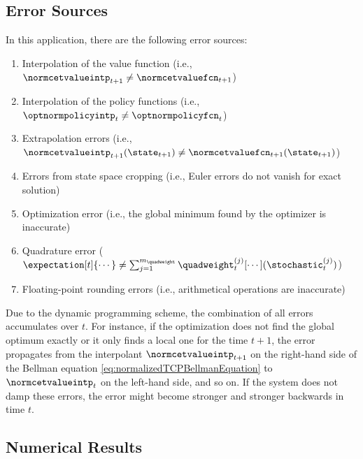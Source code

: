 \subsection{Error Sources}
\label{sec:842errorSources}


In this application, there are the following error sources:

\begin{enumerate}[label=E\arabic*.,ref=E\arabic*,leftmargin=2.7em]
  \item
  Interpolation of the value function
  (i.e., $\normcetvalueintp_{t+1} \not= \normcetvaluefcn_{t+1}$)
  
  \item
  Interpolation of the policy functions
  (i.e., $\optnormpolicyintp_t \not= \optnormpolicyfcn_t$)
  
  \item
  Extrapolation errors
  (i.e., $
  \normcetvalueintp_{t+1}(\state_{t+1})
  \not= \normcetvaluefcn_{t+1}(\state_{t+1})
  $)
  
  \item
  Errors from state space cropping
  (i.e., Euler errors do not vanish for exact solution)
  
  \item
  Optimization error
  (i.e., the global minimum found by the optimizer is inaccurate)
  
  \item
  Quadrature error
  ($
  \expectation[t]{\cdots}
  \not= \sum_{j=1}^{m_{\quadweight}} \quadweight_t^{(j)}
  [\cdots](\stochastic_t^{(j)})
  $)
  
  \item
  Floating-point rounding errors
  (i.e., arithmetical operations are inaccurate)
\end{enumerate}
Due to the dynamic programming scheme,
the combination of all errors accumulates over $t$.
For instance, if the optimization does not find the global optimum
exactly or it only finds a local one for the time $t + 1$,
the error propagates from the interpolant $\normcetvalueintp_{t+1}$
on the right-hand side of the Bellman equation
\eqref{eq:normalizedTCPBellmanEquation} to $\normcetvalueintp_t$
on the left-hand side, and so on.
If the system does not damp these errors,
the error might become stronger and stronger backwards in time $t$.



\subsection{Numerical Results}
\label{sec:843results}

